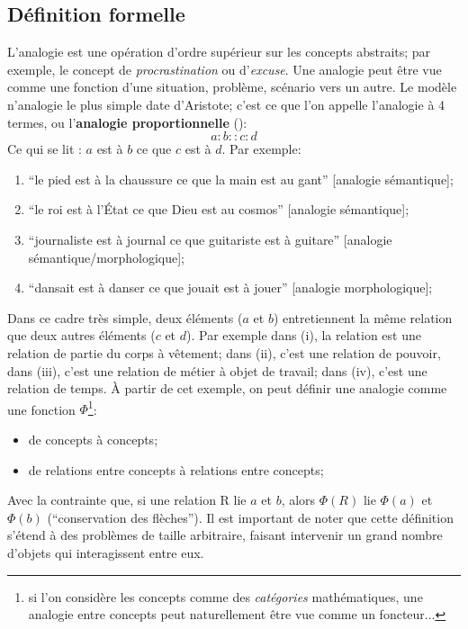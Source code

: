 \documentclass[french]{article}
\begin{document}
			\subsection{Définition formelle}
			L'analogie est une opération d'ordre supérieur sur les concepts abstraits; par exemple, le concept de \textit{procrastination} ou d'\textit{excuse}. Une analogie peut être vue comme une fonction d'une situation, problème, scénario vers un autre.
			Le modèle n'analogie le plus simple date d'Aristote; c'est ce que l'on appelle l'analogie à 4 termes, ou l'\textbf{analogie proportionnelle} (\cite{holyoak2012}):
			\begin{equation*}
			a:b::c:d
			\end{equation*}
			Ce qui se lit : $a$ est à $b$ ce que $c$ est à $d$. Par exemple:
			\begin{enumerate}[label=(\roman*)]
				\item ``le pied est à la chaussure ce que la main est au gant'' [analogie sémantique];
				\item ``le roi est à l’État ce que Dieu est au cosmos'' [analogie sémantique];
				\item ``journaliste est à journal ce que guitariste est à guitare'' [analogie sémantique/morphologique];
				\item ``dansait est à danser ce que jouait est à jouer'' [analogie morphologique];
			\end{enumerate}
			Dans ce cadre très simple, deux éléments ($a$ et $b$) entretiennent la même relation que deux autres éléments ($c$ et $d$). Par exemple dans (i), la relation est une relation de partie du corps à vêtement; dans (ii), c'est une relation de pouvoir, dans (iii), c'est une relation de métier à objet de travail; dans (iv), c'est une relation de temps. À partir de cet exemple, on peut définir une analogie comme une fonction $\Phi$\footnote{si l'on considère les concepts comme des \textit{catégories} mathématiques, une analogie entre concepts peut naturellement être vue comme un foncteur...}:
			\begin{itemize}
				\item de concepts à concepts;
				\item de relations entre concepts à relations entre concepts;
			\end{itemize}
			Avec la contrainte que, si une relation R lie $a$ et $b$, alors $\Phi(R)$ lie $\Phi(a)$ et $\Phi(b)$ (``conservation des flèches''). Il est important de noter que cette définition s'étend à des problèmes de taille arbitraire, faisant intervenir un grand nombre d'objets qui interagissent entre eux. \\
\end{document}
